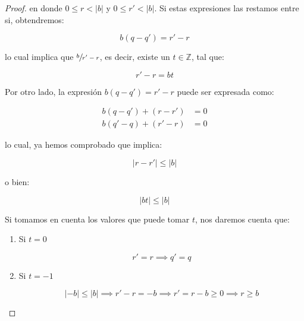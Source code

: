 \begin{proof}
            en donde $0 \leq r < |b|$ y $0 \leq r' < |b|$.
            Si estas expresiones las restamos entre si, obtendremos:

            \begin{equation*}
                b(q - q') = r' - r
            \end{equation*}

            lo cual implica que $\sfrac{b}{r' - r}$, es decir, existe un $t \in \mathbb{Z}$, tal que:

            \begin{equation*}
                r' - r = bt
            \end{equation*}

            Por otro lado, la expresión $b(q - q') = r' - r$ puede ser expresada como:

            \begin{align*}
                b(q - q') + (r - r') &= 0 \\
                b(q' - q) + (r' - r) &= 0
            \end{align*}

            lo cual, ya hemos comprobado que implica:

            \begin{equation*}
                |r - r'| \leq |b|
            \end{equation*}

            o bien:

            \begin{equation*}
                |bt| \leq |b|
            \end{equation*}

            Si tomamos en cuenta los valores que puede tomar $t$, nos daremos cuenta que:

            \begin{enumerate}
                \item Si $t = 0$

                \begin{equation*}
                    r' = r \implies q' = q
                \end{equation*}

                \item Si $t = -1$

                \begin{equation*}
                    |-b| \leq |b| \implies r' - r = -b \implies r' = r - b \geq 0 \implies r \geq b
                \end{equation*}


\end{enumerate}
\end{proof}
